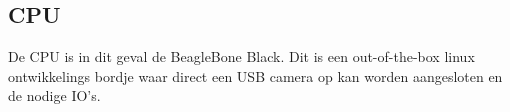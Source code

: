 \subsection{CPU}

De CPU is in dit geval de BeagleBone Black. Dit is een out-of-the-box linux ontwikkelings
bordje waar direct een USB camera op kan worden aangesloten en de nodige IO's.
